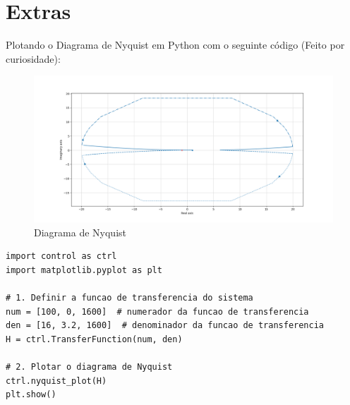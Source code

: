 \documentclass[10pt]{article}
\begin{document}
\newpage

\section{Extras}

\quad Plotando o Diagrama de Nyquist em Python com o seguinte código (Feito por curiosidade):

\begin{figure}[h]
    \centering
    \includegraphics[scale=0.45]{nyquist.png}
    \caption{Diagrama de Nyquist}
\end{figure}

\begin{lstlisting}
import control as ctrl
import matplotlib.pyplot as plt

# 1. Definir a funcao de transferencia do sistema
num = [100, 0, 1600]  # numerador da funcao de transferencia
den = [16, 3.2, 1600]  # denominador da funcao de transferencia
H = ctrl.TransferFunction(num, den)

# 2. Plotar o diagrama de Nyquist
ctrl.nyquist_plot(H)
plt.show()
\end{lstlisting}
\end{document}
